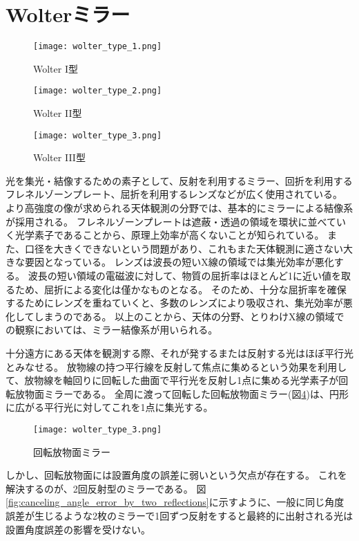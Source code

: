 \section{Wolterミラー}
\label{chap1_wolter_mirror}

\begin{figure}[b]
\centering
\texttt{[image: wolter\_type\_1.png]}
\caption{Wolter I型}
\label{fig:wolter_type_1}
\end{figure}

\begin{figure}[b]
\centering
\texttt{[image: wolter\_type\_2.png]}
\caption{Wolter II型}
\label{fig:wolter_type_2}
\end{figure}

\begin{figure}[b]
\centering
\texttt{[image: wolter\_type\_3.png]}
\caption{Wolter III型}
\label{fig:wolter_type_3}
\end{figure}

光を集光・結像するための素子として、反射を利用するミラー、回折を利用するフレネルゾーンプレート、屈折を利用するレンズなどが広く使用されている。
より高強度の像が求められる天体観測の分野では、基本的にミラーによる結像系が採用される。
フレネルゾーンプレートは遮蔽・透過の領域を環状に並べていく光学素子であることから、原理上効率が高くないことが知られている。
また、口径を大きくできないという問題があり、これもまた天体観測に適さない大きな要因となっている。
レンズは波長の短いX線の領域では集光効率が悪化する。
波長の短い領域の電磁波に対して、物質の屈折率はほとんど1に近い値を取るため、屈折による変化は僅かなものとなる。
そのため、十分な屈折率を確保するためにレンズを重ねていくと、多数のレンズにより吸収され、集光効率が悪化してしまうのである。
以上のことから、天体の分野、とりわけX線の領域での観察においては、ミラー結像系が用いられる。

十分遠方にある天体を観測する際、それが発するまたは反射する光はほぼ平行光とみなせる。
放物線の持つ平行線を反射して焦点に集めるという効果を利用して、放物線を軸回りに回転した曲面で平行光を反射し1点に集める光学素子が回転放物面ミラーである。
全周に渡って回転した回転放物面ミラー(図\ref{fig:parabola_rotation_mirror})は、円形に広がる平行光に対してこれを1点に集光する。

\begin{figure}[b]
\centering
\texttt{[image: wolter\_type\_3.png]}
\caption{回転放物面ミラー}
\label{fig:parabola_rotation_mirror}
\end{figure}

しかし、回転放物面には設置角度の誤差に弱いという欠点が存在する。
これを解決するのが、2回反射型のミラーである。
図\ref{fig:canceling_angle_error_by_two_reflections}に示すように、一般に同じ角度誤差が生じるような2枚のミラーで1回ずつ反射をすると最終的に出射される光は設置角度誤差の影響を受けない。

